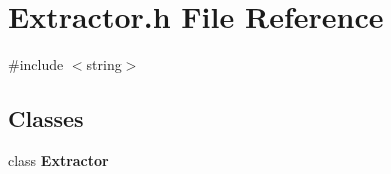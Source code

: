 \section{Extractor.\+h File Reference}
\label{Extractor_8h}
{\ttfamily \#include $<$string$>$}\newline
\subsection*{Classes}
\begin{DoxyCompactItemize}
\item 
class \textbf{ Extractor}
\end{DoxyCompactItemize}

